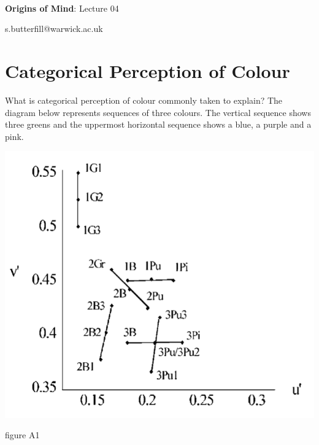\documentclass[12pt]{extarticle}
\date{}
\makeatletter
\def \ititle {Origins of Mind}
\def \isubtitle {Lecture 02}
\def \iemail{s.butterfill@warwick.ac.uk}
\makeatother
\begin{document}
\begin{multicols}{3}

\setlength\footnotesep{1em}








\def \ititle {Origins of Mind}
 
\def \isubtitle {Lecture 04}
 
 
 
\
 
 
 
\begin{center}
 
{\Large
 
\textbf{\ititle}: \isubtitle
 
}
 
 
 
\iemail %
 
\end{center}
 
 
 
\section{Categorical Perception of Colour}
 
What is categorical perception of colour commonly taken to explain?
The diagram below represents sequences of three colours.
The vertical sequence shows three greens and the uppermost horizontal sequence shows a blue, a purple and a pink.
\begin{center}
\includegraphics[scale=0.3]{daoutis_2006_fig_A1.png}
\end{center}
\begin{center} \citealp{Daoutis:2006ij} figure A1 \end{center}
 

\end{multicols}
\end{document}
